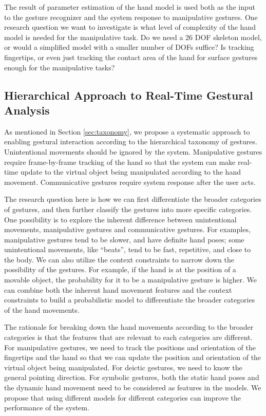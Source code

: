 The result of parameter estimation of the hand model is used both as the input
to the gesture recognizer and the system response to manipulative gestures. One
research question we want to investigate is what level of complexity of the
hand model is needed for the manipulative task. Do we need a 26 DOF skeleton
model, or would a simplified model with a smaller number of DOFs suffice?
Is tracking fingertips, or even just tracking the contact area of the hand for
surface gestures enough for the manipulative tasks?

\subsection{Hierarchical Approach to Real-Time Gestural Analysis}
As mentioned in Section \ref{sec:taxonomy}, we propose a systematic approach to
enabling gestural interaction according to the hierarchical taxonomy of
gestures. Unintentional movements should be ignored by the system.
Manipulative gestures require frame-by-frame tracking of the hand so that the
system can make real-time update to the virtual object being manipulated according to the hand
movement. Communicative gestures require system response after the user acts.

The research question here is how we can first differentiate the broader
categories of gestures, and then further classify the gestures into more 
specific categories. One possibility is to explore the inherent difference
between unintentional movements, manipulative gestures and communicative
gestures. For examples, manipulative gestures tend to be
slower, and have definite hand poses; some unintentional movements, like
``beats'', tend to be fast, repetitive, and close to the body. We can also
utilize the context constraints to narrow down the possibility of the gestures. For example, if the hand is at the position of a movable object, the probability
for it to be a manipulative gesture is higher. We can combine both the inherent
hand movement features and the context constraints to build a probabilistic
model to differentiate the broader categories of the hand movements.

The rationale for breaking down the hand movements according to the broader
categories is that the features that are relevant to each categories are
different. For manipulative gestures, we need to track the positions and 
orientation of the fingertips and the hand so that we can update the position 
and orientation of the virtual object being manipulated. For deictic gestures, 
we need to know the general pointing direction. For symbolic gestures, both the 
static hand poses and the dynamic hand movement need to be considered as 
features in the models. We propose that using different models for
different categories can improve the performance of the system. 

